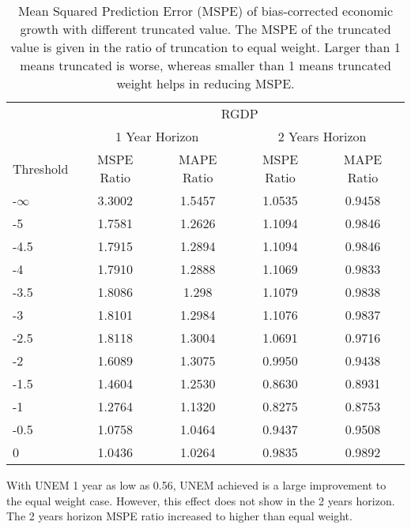 \documentclass[11pt]{article}
\begin{document}
\begin{table}[!h]
	\centering
	\caption{Mean Squared Prediction Error (MSPE) of bias-corrected economic growth with different truncated value. The MSPE of the truncated value is given in the ratio of truncation to equal weight. Larger than 1 means truncated is worse, whereas smaller than 1 means truncated weight helps in reducing MSPE.}
	\label{tab: MSPE RGDP bias}
	\begin{tabular}{lcccc}
		\hline
		&                        \multicolumn{4}{c}{RGDP}                         \\
		\cmidrule(lr){2-5}                              & \multicolumn{2}{c}{1 Year Horizon} & \multicolumn{2}{c}{2 Years Horizon} \\
		\cmidrule(lr){2-3} \cmidrule(lr){4-5}
		Threshold & MSPE Ratio & MAPE Ratio  & MSPE Ratio & MAPE Ratio  \\ \hline
		-$\infty$ & 3.3002 & 1.5457 & 1.0535 & 0.9458\\ 
		-5 & 1.7581 & 1.2626 & 1.1094 & 0.9846\\ 
		-4.5 & 1.7915 & 1.2894 & 1.1094 & 0.9846\\ 
		-4 & 1.7910 & 1.2888 & 1.1069 & 0.9833\\ 
		-3.5 & 1.8086 & 1.298 & 1.1079 & 0.9838\\ 
		-3 & 1.8101 & 1.2984 & 1.1076 & 0.9837\\ 
		-2.5 & 1.8118 & 1.3004 & 1.0691 & 0.9716\\ 
		-2 & 1.6089 & 1.3075 & 0.9950 & 0.9438\\ 
		-1.5 & 1.4604 & 1.2530 & 0.8630 & 0.8931\\ 
		-1 & 1.2764 & 1.1320 & 0.8275 & 0.8753\\ 
		-0.5 & 1.0758 & 1.0464 & 0.9437 & 0.9508\\ 
		0 & 1.0436 & 1.0264 & 0.9835 & 0.9892\\ \hline
	\end{tabular}
\end{table}


With UNEM 1 year as low as 0.56, UNEM achieved is a large improvement to the equal weight case. However, this effect does not show in the 2 years horizon. The 2 years horizon MSPE ratio increased to higher than equal weight.
\end{document}

